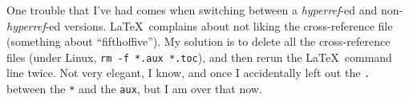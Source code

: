 \documentclass[titlepage]{article}
\makeatletter
\renewcommand{\subsubsection}{\@startsection{subsubsection}%
  {3}%
  {0em}%
  {1.75ex plus.25ex minus.25ex}%
  {.5ex plus .05ex}%
  {\bfseries\raggedright}}
\makeatother
\begin{document}
One trouble that I've had comes when switching between 
a \textit{hyperref}-ed and non-\textit{hyperref}-ed versions.
\LaTeX\ complains about not liking the cross-reference file
(something about ``fifthoffive'').
My solution is to delete all the cross-reference files 
(under Linux, \verb!rm -f *.aux *.toc!), 
and then rerun the \LaTeX\ command line twice.
Not very elegant, I know, and once I accidentally left out the 
\verb!.! between the \verb!*! and the \verb!aux!, but I am over that now.








\end{document}
